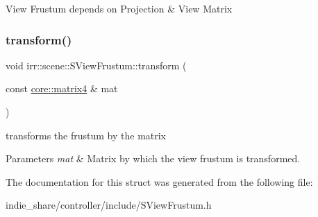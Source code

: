 View Frustum depends on Projection \& View Matrix \mbox{\label{structirr_1_1scene_1_1SViewFrustum_aeabadaf532f08ba3cb98b897ff0619f2}} 
\subsubsection{\texorpdfstring{transform()}{transform()}}
{\footnotesize\ttfamily void irr\+::scene\+::\+S\+View\+Frustum\+::transform (\begin{DoxyParamCaption}\item[{const \hyperlink{namespaceirr_1_1core_a73fa92e638c5ca97efd72da307cc9b65}{core\+::matrix4} \&}]{mat }\end{DoxyParamCaption})\hspace{0.3cm}{\ttfamily [inline]}}



transforms the frustum by the matrix 


\begin{DoxyParams}{Parameters}
{\em mat} & Matrix by which the view frustum is transformed. \\
\hline
\end{DoxyParams}


The documentation for this struct was generated from the following file\+:\begin{DoxyCompactItemize}
\item 
indie\+\_\+share/controller/include/S\+View\+Frustum.\+h\end{DoxyCompactItemize}
